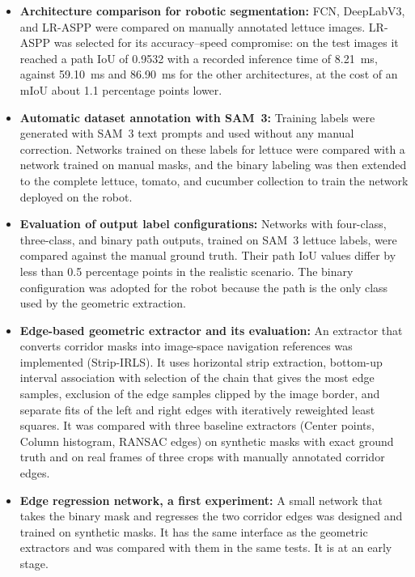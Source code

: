 \begin{itemize}
\item \textbf{Architecture comparison for robotic segmentation:} FCN, DeepLabV3, and LR-ASPP were compared on manually annotated lettuce images. LR-ASPP was selected for its accuracy--speed compromise: on the test images it reached a path IoU of 0.9532 with a recorded inference time of 8.21~ms, against 59.10~ms and 86.90~ms for the other architectures, at the cost of an mIoU about 1.1 percentage points lower.

\item \textbf{Automatic dataset annotation with SAM~3:} Training labels were generated with SAM~3 text prompts and used without any manual correction. Networks trained on these labels for lettuce were compared with a network trained on manual masks, and the binary labeling was then extended to the complete lettuce, tomato, and cucumber collection to train the network deployed on the robot.

\item \textbf{Evaluation of output label configurations:} Networks with four-class, three-class, and binary path outputs, trained on SAM~3 lettuce labels, were compared against the manual ground truth. Their path IoU values differ by less than 0.5 percentage points in the realistic scenario. The binary configuration was adopted for the robot because the path is the only class used by the geometric extraction.

\item \textbf{Edge-based geometric extractor and its evaluation:} An extractor that converts corridor masks into image-space navigation references was implemented (Strip-IRLS). It uses horizontal strip extraction, bottom-up interval association with selection of the chain that gives the most edge samples, exclusion of the edge samples clipped by the image border, and separate fits of the left and right edges with iteratively reweighted least squares. It was compared with three baseline extractors (Center points, Column histogram, RANSAC edges) on synthetic masks with exact ground truth and on real frames of three crops with manually annotated corridor edges.

\item \textbf{Edge regression network, a first experiment:} A small network that takes the binary mask and regresses the two corridor edges was designed and trained on synthetic masks. It has the same interface as the geometric extractors and was compared with them in the same tests. It is at an early stage.


\end{itemize}

